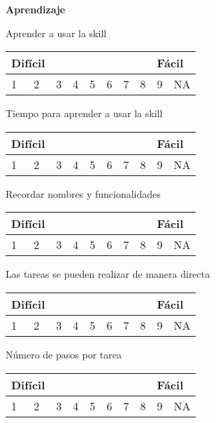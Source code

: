\begin{tcolorbox}[colback=white!25!white,colframe=blue]
  \hfill

  \textbf{Aprendizaje}

  Aprender a usar la skill

  \begin{tabular}{| p{1cm} | p{1cm} | p{1cm} | p{1cm} | p{1cm} | p{1cm} | p{1cm} | p{1cm} | p{1cm} | p{1cm} |}
    \multicolumn{2}{p{1cm}}{Difícil} & \multicolumn{6}{p{1cm}}{} & \multicolumn{2}{p{1cm}}{Fácil} \\ \hline
    1 & 2 & 3 & 4 & 5 & 6 & 7 & 8 & 9 & NA \\ \hline
  \end{tabular}

  Tiempo para aprender a usar la skill

  \begin{tabular}{| p{1cm} | p{1cm} | p{1cm} | p{1cm} | p{1cm} | p{1cm} | p{1cm} | p{1cm} | p{1cm} | p{1cm} |}
    \multicolumn{2}{p{1cm}}{Difícil} & \multicolumn{6}{p{1cm}}{} & \multicolumn{2}{p{1cm}}{Fácil} \\ \hline
    1 & 2 & 3 & 4 & 5 & 6 & 7 & 8 & 9 & NA \\ \hline
  \end{tabular}

  Recordar nombres y funcionalidades

  \begin{tabular}{| p{1cm} | p{1cm} | p{1cm} | p{1cm} | p{1cm} | p{1cm} | p{1cm} | p{1cm} | p{1cm} | p{1cm} |}
    \multicolumn{2}{p{1cm}}{Difícil} & \multicolumn{6}{p{1cm}}{} & \multicolumn{2}{p{1cm}}{Fácil} \\ \hline
    1 & 2 & 3 & 4 & 5 & 6 & 7 & 8 & 9 & NA \\ \hline
  \end{tabular}

  Las tareas se pueden realizar de manera directa

  \begin{tabular}{| p{1cm} | p{1cm} | p{1cm} | p{1cm} | p{1cm} | p{1cm} | p{1cm} | p{1cm} | p{1cm} | p{1cm} |}
    \multicolumn{2}{p{1cm}}{Difícil} & \multicolumn{6}{p{1cm}}{} & \multicolumn{2}{p{1cm}}{Fácil} \\ \hline
    1 & 2 & 3 & 4 & 5 & 6 & 7 & 8 & 9 & NA \\ \hline
  \end{tabular}

  Número de pasos por tarea

  \begin{tabular}{| p{1cm} | p{1cm} | p{1cm} | p{1cm} | p{1cm} | p{1cm} | p{1cm} | p{1cm} | p{1cm} | p{1cm} |}
    \multicolumn{2}{p{1cm}}{Difícil} & \multicolumn{6}{p{1cm}}{} & \multicolumn{2}{p{1cm}}{Fácil} \\ \hline
    1 & 2 & 3 & 4 & 5 & 6 & 7 & 8 & 9 & NA \\ \hline
  \end{tabular}


\end{tcolorbox}
